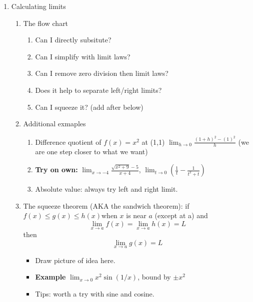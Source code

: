 \documentclass{article}
\newcommand{\ds}{\displaystyle}
\begin{document}
\begin{enumerate}
\item Calculating limits
\begin{enumerate}
\item The flow chart
\begin{enumerate}
\item Can I directly subsitute?
\item Can I simplify with limit laws?
\item Can I remove zero division then limit laws?
\item Does it help to separate left/right limits?
\item Can I squeeze it? (add after below)
\end{enumerate}
\item Additional exmaples
\begin{enumerate}
\item Difference quotient of $f(x) = x^2$ at (1,1) $\ds \lim_{h\rightarrow 0}\frac{(1+h)^2-(1)^2}{h}$ (we are one step  closer to what we want)
\item {\bf Try on own: } $\ds \lim_{x\rightarrow -4}\frac{\sqrt{x^2+9}-5}{x+4}$, $ \ds \lim_{t\rightarrow 0} \left( \frac{1}{t} - \frac{1}{t^2+t} \right)$
\item Absolute value: always try left and right limit.
\end{enumerate}
\item The squeeze theorem (AKA the sandwich theorem): if $f(x)\leq g(x)\leq h(x)$when $x$ is near $a$ (except at a) and
$$
\lim_{x\rightarrow a}f(x) = \lim_{x\rightarrow a}h(x) = L
$$
then 
$$
\lim_{x\rightarrow a} g(x) = L
$$
\begin{itemize}
\item Draw picture of idea here.
\item {\bf Example} $ \ds \lim_{x \rightarrow 0}x^2\sin(1/x)$, bound by $\pm x^2$
\item Tips: worth a try with sine and cosine.
\end{itemize}
\end{enumerate}

\end{enumerate}


\end{document}
